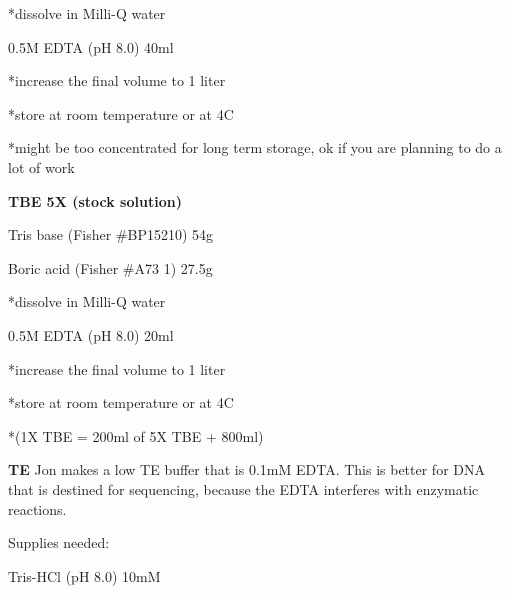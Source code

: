 \documentclass[11pt, oneside]{article}
\begin{document}
			\hspace{2mm}*dissolve in Milli-Q water

			\hspace{2mm}0.5M EDTA (pH 8.0)		\hspace{25mm}			40ml

			\hspace{2mm}*increase the final volume to 1 liter

			\hspace{2mm}*store at room temperature or at 4C

			\hspace{2mm}*might be too concentrated for long term storage, ok if you are planning to do a lot of work
	
		\vspace{5mm}

	\newpage

		{\bf TBE 5X (stock solution)}

			\hspace{2mm}Tris base 	\hspace{5mm}	(Fisher \#BP15210)	\hspace{5mm}	54g

			\hspace{2mm}Boric acid	\hspace{3mm}	(Fisher \#A73 1)	\hspace{10mm}	27.5g

			\hspace{2mm}*dissolve in Milli-Q water

			\hspace{2mm}0.5M EDTA (pH 8.0)		\hspace{25mm}			20ml

			\hspace{2mm}*increase the final volume to 1 liter

			\hspace{2mm}*store at room temperature or at 4C

			\hspace{2mm}*(1X TBE = 200ml of 5X TBE + 800ml)

		\vspace{5mm}

		{\bf TE}
		Jon makes a low TE buffer that is 0.1mM EDTA.  This is better for DNA that is destined for sequencing, because the EDTA interferes with enzymatic reactions.

			\hspace{2mm}Supplies needed:
		
			\hspace{5mm}Tris-HCl (pH 8.0) 10mM
\end{document}
